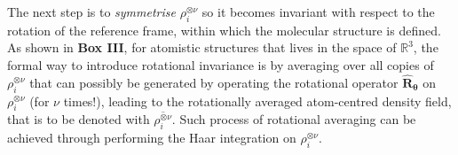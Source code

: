 The next step is to \emph{symmetrise} $\rho^{\otimes \nu}_i$  so it becomes invariant with respect to the rotation of the reference frame, within which the molecular structure is defined. As shown in \textbf{Box III}, for atomistic structures that lives in the space of $\mathbb{R}^3$, the formal way to introduce rotational invariance is by averaging over all copies of $\rho^{\otimes\nu}_i$ that can possibly be generated by operating the rotational operator $\hat{\bm{R}}_{\boldsymbol{\theta}}$ on $\rho^{\otimes\nu}_i$ (for $\nu$ times!), leading to the rotationally averaged atom-centred density field, that is to be denoted with $\overline{\rho^{\otimes \nu}_i}$. Such process of rotational averaging can be achieved through performing the Haar integration on $\rho^{\otimes\nu}_i$.

%
%

